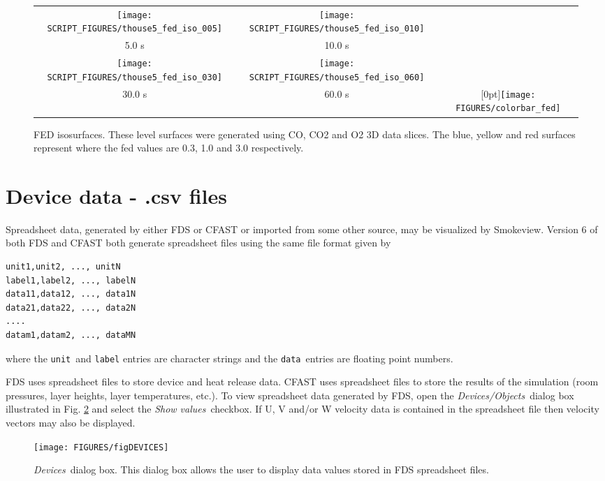 \documentclass[11pt,twoside]{book}
\begin{document}
\begin{figure}[\figoptions]
\begin{center}
\begin{tabular}{ccc}
\texttt{[image: SCRIPT\_FIGURES/thouse5\_fed\_iso\_005]}&
\texttt{[image: SCRIPT\_FIGURES/thouse5\_fed\_iso\_010]}\\
5.0 s&10.0 s\\
\texttt{[image: SCRIPT\_FIGURES/thouse5\_fed\_iso\_030]}&
\texttt{[image: SCRIPT\_FIGURES/thouse5\_fed\_iso\_060]}&\\
30.0 s&60.0 s
&\raisebox{0.0ex}[0pt]{\texttt{[image: FIGURES/colorbar\_fed]}}\\
\end{tabular}
\caption [FED slices.]
{FED isosurfaces.
These level surfaces were generated using CO, CO2 and O2 3D data slices.
The blue, yellow and red surfaces represent where the
fed values are 0.3, 1.0 and 3.0 respectively.
}
\label{figfediso}%
\end{center}
\end{figure}

\section{Device data - .csv files}
Spreadsheet data, generated by either FDS or CFAST or imported from some
other source, may be visualized by Smokeview.
Version 6 of both FDS and CFAST
both generate spreadsheet files using the same file format given by
\begin{lstlisting}
unit1,unit2, ..., unitN
label1,label2, ..., labelN
data11,data12, ..., data1N
data21,data22, ..., data2N
....
datam1,datam2, ..., dataMN
\end{lstlisting}
where the {\tt unit}\ and {\tt label} entries are character strings and the
{\tt data}\ entries are floating point numbers.

FDS uses spreadsheet files to store device and heat release data.
CFAST uses spreadsheet files to store the results of the
simulation (room pressures, layer heights, layer temperatures,
etc.). To view spreadsheet data generated by FDS, open the {\em
Devices/Objects}\ dialog box illustrated in Fig.
\ref{figDEVICES} and select the {\em Show values}\ checkbox. If U,
V and/or W velocity data is contained in the spreadsheet file then
velocity vectors may also be displayed.

\begin{figure}[\figoptions]
\begin{center}
\texttt{[image: FIGURES/figDEVICES]}
\end{center}
\caption[{\em Devices}\ dialog box.]{{\em Devices}\ dialog box.
This dialog box allows the user to display data values stored in
FDS spreadsheet files.} \label{figDEVICES}
\end{figure}
\end{document}
